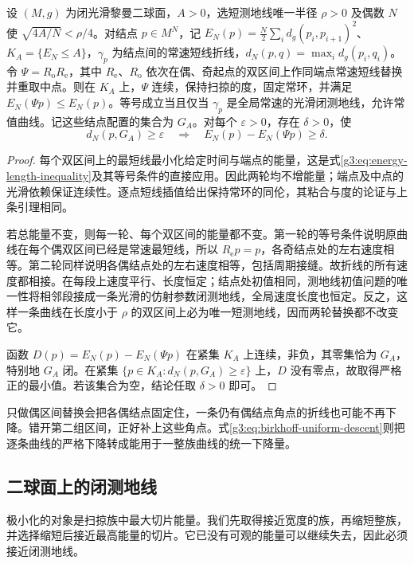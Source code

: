 \begin{proposition}\label{g3:prop:birkhoff-strict-descent}
	设 \((M,g)\) 为闭光滑黎曼二球面，\(A>0\)，选短测地线唯一半径 \(\rho>0\) 及偶数 \(N\) 使 \(\sqrt{4A/N}<\rho/4\)。对结点 \(p\in M^N\)，记 \(E_N(p)=\tfrac N2\sum_i d_g(p_i,p_{i+1})^2\)、\(K_A=\{E_N\le A\}\)，\(\gamma_p\) 为结点间的常速短线折线，\(d_N(p,q)=\max_i d_g(p_i,q_i)\)。令 \(\Psi=R_{\mathrm o}R_{\mathrm e}\)，其中 \(R_{\mathrm e}\)、\(R_{\mathrm o}\) 依次在偶、奇起点的双区间上作同端点常速短线替换并重取中点。则在 \(K_A\) 上，\(\Psi\) 连续，保持扫掠的度，固定常环，并满足 \(E_N(\Psi p)\le E_N(p)\)。等号成立当且仅当 \(\gamma_p\) 是全局常速的光滑闭测地线，允许常值曲线。记这些结点配置的集合为 \(G_A\)。对每个 \(\varepsilon>0\)，存在 \(\delta>0\)，使
	\begin{equation}\label{g3:eq:birkhoff-uniform-descent}
		d_N(p,G_A)\ge\varepsilon
		\quad\Longrightarrow\quad
		E_N(p)-E_N(\Psi p)\ge\delta.
	\end{equation}
\end{proposition}
\begin{proof}
	每个双区间上的最短线最小化给定时间与端点的能量，这是式\eqref{g3:eq:energy-length-inequality}及其等号条件的直接应用。因此两轮均不增能量；端点及中点的光滑依赖保证连续性。逐点短线插值给出保持常环的同伦，其粘合与度的论证与上条引理相同。

	若总能量不变，则每一轮、每个双区间的能量都不变。第一轮的等号条件说明原曲线在每个偶双区间已经是常速最短线，所以 \(R_{\mathrm e}p=p\)，各奇结点处的左右速度相等。第二轮同样说明各偶结点处的左右速度相等，包括周期接缝。故折线的所有速度都相接。在每段上速度平行、长度恒定；结点处初值相同，测地线初值问题的唯一性将相邻段接成一条光滑的仿射参数闭测地线，全局速度长度也恒定。反之，这样一条曲线在长度小于 \(\rho\) 的双区间上必为唯一短测地线，因而两轮替换都不改变它。

	函数 \(D(p)=E_N(p)-E_N(\Psi p)\) 在紧集 \(K_A\) 上连续，非负，其零集恰为 \(G_A\)，特别地 \(G_A\) 闭。在紧集 \(\{p\in K_A:d_N(p,G_A)\ge\varepsilon\}\) 上，\(D\) 没有零点，故取得严格正的最小值。若该集合为空，结论任取 \(\delta>0\) 即可。
\end{proof}
只做偶区间替换会把各偶结点固定住，一条仍有偶结点角点的折线也可能不再下降。错开第二组区间，正好补上这些角点。式\eqref{g3:eq:birkhoff-uniform-descent}则把逐条曲线的严格下降转成能用于一整族曲线的统一下降量。

\subsection{二球面上的闭测地线}
\label{g3:subsec:2305:03}
极小化的对象是扫掠族中最大切片能量。我们先取得接近宽度的族，再缩短整族，并选择缩短后接近最高能量的切片。它已没有可观的能量可以继续失去，因此必须接近闭测地线。

